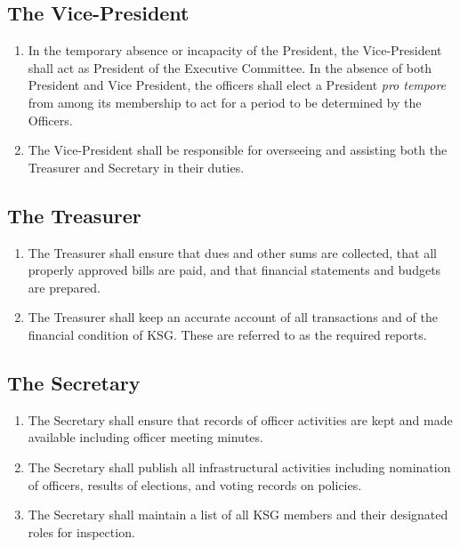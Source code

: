 \documentclass[12pt,executivepaper]{article}
\begin{document}
\subsection{The Vice-President}
\begin{enumerate}
    \item In the temporary absence or incapacity of the President, the Vice-President
          shall act as President of the Executive Committee. In the absence of both
          President and Vice President, the officers shall elect a President
          \textit{pro tempore} from among its membership to act for a period to be
          determined by the Officers.
    \item The Vice-President shall be responsible for overseeing and assisting both
          the Treasurer and Secretary in their duties.
\end{enumerate}

\subsection{The Treasurer}
\begin{enumerate}
    \item The Treasurer shall ensure that dues and other sums are collected, that all
          properly approved bills are paid, and that financial statements and budgets
          are prepared.
    \item The Treasurer shall keep an accurate account of all transactions and of the
          financial condition of KSG. These are referred to as the required reports.
\end{enumerate}

\subsection{The Secretary}
\begin{enumerate}
    \item The Secretary shall ensure that records of officer activities are kept and made
          available including officer meeting minutes.
    \item The Secretary shall publish all infrastructural activities including nomination
          of officers, results of elections, and voting records on policies.
    \item The Secretary shall maintain a list of all KSG members and their designated roles
          for inspection.
\end{enumerate}
\end{document}
